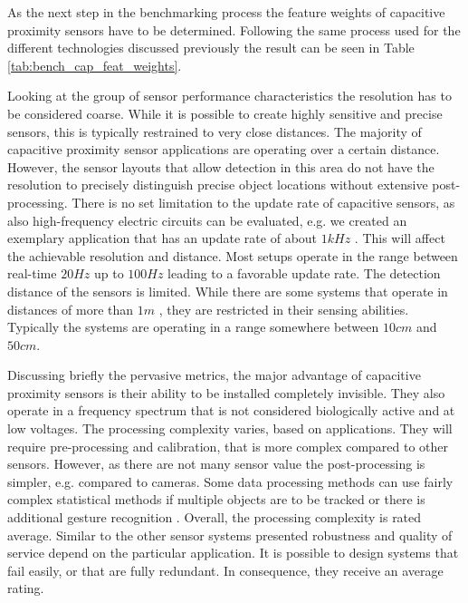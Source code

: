 As the next step in the benchmarking process the feature weights of capacitive proximity sensors have to be determined. Following the same process used for the different technologies discussed previously the result can be seen in Table \ref{tab:bench_cap_feat_weights}.

Looking at the group of sensor performance characteristics the resolution has to be considered coarse. While it is possible to create highly sensitive and precise sensors, this is typically restrained to very close distances. The majority of capacitive proximity sensor applications are operating over a certain distance. However, the sensor layouts that allow detection in this area do not have the resolution to precisely distinguish precise object locations without extensive post-processing. There is no set limitation to the update rate of capacitive sensors, as also high-frequency electric circuits can be evaluated, e.g. we created an exemplary application that has an update rate of about $1kHz$ \cite{grosse2013opencapsense}. This will affect the achievable resolution and distance. Most setups operate in the range between real-time $20Hz$ up to $100Hz$ leading to a favorable update rate. The detection distance of the sensors is limited. While there are some systems that operate in distances of more than $1m$ \cite{MacLachlan2004}, they are restricted in their sensing abilities. Typically the systems are operating in a range somewhere between $10cm$ and $50cm$. 

Discussing briefly the pervasive metrics, the major advantage of capacitive proximity sensors is their ability to be installed completely invisible. They also operate in a frequency spectrum that is not considered biologically active and at low voltages. The processing complexity varies, based on applications. They will require pre-processing and calibration, that is more complex compared to other sensors. However, as there are not many sensor value the post-processing is simpler, e.g. compared to cameras. Some data processing methods can use fairly complex statistical methods if multiple objects are to be tracked or there is additional gesture recognition \cite{grosse2013swiss}. Overall, the processing complexity is rated average. Similar to the other sensor systems presented robustness and quality of service depend on the particular application. It is possible to design systems that fail easily, or that are fully redundant. In consequence, they receive an average rating. 

